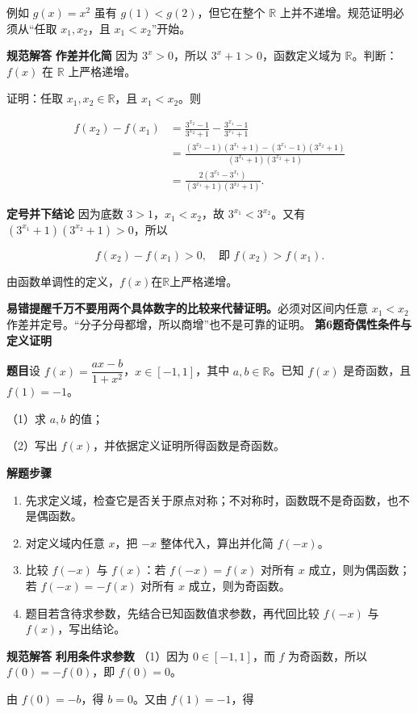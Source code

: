 \documentclass[UTF8,zihao=-4]{ctexart}
\newcommand{\subq}[1]{\par\Needspace{2\baselineskip}（#1）}
\newcommand{\labeltext}[1]{\par\textbf{#1}\quad}
\begin{document}
例如 $g(x)=x^2$ 虽有 $g(1)<g(2)$，但它在整个 $\mathbb R$ 上并不递增。规范证明必须从“任取 $x_1,x_2$，且 $x_1<x_2$”开始。\par
\labeltext{规范解答}
\textbf{作差并化简}\quad
因为 $3^x>0$，所以 $3^x+1>0$，函数定义域为 $\mathbb R$。判断：$f(x)$ 在 $\mathbb R$ 上严格递增。\par
证明：任取 $x_1,x_2\in\mathbb R$，且 $x_1<x_2$。则\par
\[\begin{aligned} f(x_2)-f(x_1)&=\frac{3^{x_2}-1}{3^{x_2}+1}-\frac{3^{x_1}-1}{3^{x_1}+1}\\ &=\frac{(3^{x_2}-1)(3^{x_1}+1)-(3^{x_1}-1)(3^{x_2}+1)}{(3^{x_1}+1)(3^{x_2}+1)}\\ &=\frac{2(3^{x_2}-3^{x_1})}{(3^{x_1}+1)(3^{x_2}+1)}.\end{aligned}\]\par
\par{}
\textbf{定号并下结论}\quad
因为底数 $3>1$，$x_1<x_2$，故 $3^{x_1}<3^{x_2}$。又有 $(3^{x_1}+1)(3^{x_2}+1)>0$，所以\par
\[f(x_2)-f(x_1)>0,\quad\text{即 }f(x_2)>f(x_1).\]\par
由函数单调性的定义，$\boxed{f(x)\text{在}\mathbb R\text{上严格递增}}$。\par
\labeltext{易错提醒}\textbf{千万不要用两个具体数字的比较来代替证明。}必须对区间内任意 $x_1<x_2$ 作差并定号。“分子分母都增，所以商增”也不是可靠的证明。
\clearpage
{\Large\bfseries 第6题\quad 奇偶性条件与定义证明}
\labeltext{题目}设 $f(x)=\dfrac{ax-b}{1+x^2}$，$x\in[-1,1]$，其中 $a,b\in\mathbb R$。已知 $f(x)$ 是奇函数，且 $f(1)=-1$。
\subq{1}求 $a,b$ 的值；
\subq{2}写出 $f(x)$，并依据定义证明所得函数是奇函数。
\labeltext{解题步骤}\begin{enumerate}
\item 先求定义域，检查它是否关于原点对称；不对称时，函数既不是奇函数，也不是偶函数。
\item 对定义域内任意 $x$，把 $-x$ 整体代入，算出并化简 $f(-x)$。
\item 比较 $f(-x)$ 与 $f(x)$：若 $f(-x)=f(x)$ 对所有 $x$ 成立，则为偶函数；若 $f(-x)=-f(x)$ 对所有 $x$ 成立，则为奇函数。
\item 题目若含待求参数，先结合已知函数值求参数，再代回比较 $f(-x)$ 与 $f(x)$，写出结论。
\end{enumerate}
\labeltext{规范解答}
\textbf{利用条件求参数}\quad
（1）因为 $0\in[-1,1]$，而 $f$ 为奇函数，所以 $f(0)=-f(0)$，即 $f(0)=0$。\par
由 $f(0)=-b$，得 $b=0$。又由 $f(1)=-1$，得\par
\end{document}
